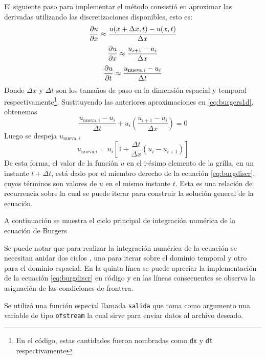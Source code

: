 \documentclass[12pt]{article}
\begin{document}
	El siguiente paso para implementar el método consistió en aproximar las derivadas utilizando las discretizaciones disponibles, esto es:
	\begin{equation}
		\pdv{u}{x} \approx \frac{u(x+\Delta x,t)-u(x,t)}{\Delta x}
	\end{equation}
	\begin{equation}
		\pdv{u}{x} \approx \frac{u_{i+1}-u_{i}}{\Delta x}
	\end{equation}
	\begin{equation}
		\pdv{u}{t} \approx \frac{u_{\text{nueva},i}-u_{i}}{\Delta t}
	\end{equation}
	Donde $\Delta x$ y $\Delta t$ son los tamaños de paso en la dimensión espacial y temporal respectivamente\footnote{En el código, estas cantidades fueron nombradas como \texttt{dx} y \texttt{dt} respectivamente}. Sustituyendo las anteriores aproximaciones en \ref{eq:burgers1d}, obtenemos
	\begin{equation}
		\frac{u_{\text{nueva},i}-u_{i}}{\Delta t}+u_{i}\left( \frac{u_{i+1}-u_{i}}{\Delta x}\right) =0
	\end{equation}
	Luego se despeja $u_{\text{nueva},i}$
	\begin{equation}
		u_{\text{nueva,}i} = u_{i}\left[ 1 + \frac{\Delta t}{\Delta x}(u_{i}-u_{i+1}) \right]
		\label{eq:burgdiscr}
	\end{equation}
	De esta forma, el valor de la función $u$ en el i-ésimo elemento de la grilla, en un instante $t + \Delta t$, está dado por el miembro derecho de la ecuación \ref{eq:burgdiscr}, cuyos términos son valores de $u$ en el mismo instante $t$. Esta es una relación de recurrencia sobre la cual se puede iterar para construir la solución general de la ecuación.
	
	A continuación se muestra el ciclo principal de integración numérica de la ecuación de Burgers
	
	
	Se puede notar que para realizar la integración numérica de la ecuación se necesitan anidar dos ciclos \texttt{\color{blue}{for}}, uno para iterar sobre el dominio temporal y otro para el dominio espacial. En la quinta línea se puede apreciar la implementación de la ecuación \ref{eq:burgdiscr} en código y en las líneas consecuentes se observa la asignación de las condiciones de frontera.
	
	Se utilizó una función especial llamada \texttt{salida} que toma como argumento una variable de tipo \texttt{ofstream} la cual sirve para enviar datos al archivo deseado.
	
\end{document}
